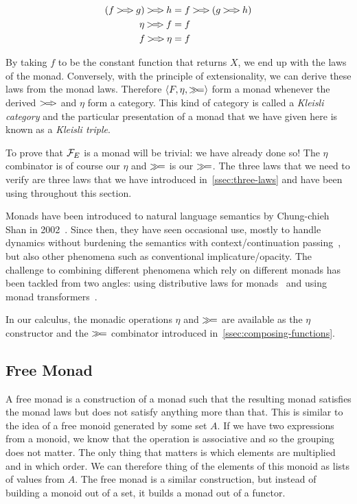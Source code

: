 \begin{align*}
  (f \kleisli g) \kleisli h &= f \kleisli (g \kleisli h) \\
  \eta \kleisli f &= f \\
  f \kleisli \eta &= f
\end{align*}

By taking $f$ to be the constant function that returns $X$, we end up with
the laws of the monad. Conversely, with the principle of extensionality, we
can derive these laws from the monad laws. Therefore
$\left<F, \eta, \mathbin{\gg\!=}\right>$ form a monad whenever the derived
$\mathbin{>\!=\!\!>}$ and $\eta$ form a category. This kind of category is called a
\emph{Kleisli category} and the particular presentation of a monad that we
have given here is known as a \emph{Kleisli triple}.

To prove that $\mathcal{F}_E$ is a monad will be trivial: we have already done so!
The $\eta$ combinator is of course our $\eta$ and $\mathbin{\gg\!=}$ is our
$\mathbin{\gg\!=}$. The three laws that we need to verify are three laws that we
have introduced in~\ref{ssec:three-laws} and have been using throughout
this section.

Monads have been introduced to natural language semantics by Chung-chieh
Shan in 2002~\cite{shan2002monads}. Since then, they have seen occasional
use, mostly to handle dynamics without burdening the semantics with
context/continuation passing~\cite{unger2011dynamic,champollion2015back},
but also other phenomena such as conventional
implicature/opacity\cite{giorgolo2011multidimensional,giorgolo2014monads,giorgolo2012missing}. The
challenge to combining different phenomena which rely on different monads
has been tackled from two angles: using distributive laws for
monads~\cite{giorgolo2015natural} and using monad
transformers~\cite{charlow2014semantics,barker2015monads}.

In our calculus, the monadic operations $\eta$ and $\mathbin{\gg\!=}$ are available
as the $\eta$ constructor and the $\mathbin{\gg\!=}$ combinator introduced
in~\ref{ssec:composing-functions}.

\subsection{Free Monad}
\label{ssec:free-monad}

A free monad is a construction of a monad such that the resulting monad
satisfies the monad laws but does not satisfy anything more than that. This
is similar to the idea of a free monoid generated by some set $A$. If we
have two expressions from a monoid, we know that the operation is
associative and so the grouping does not matter. The only thing that
matters is which elements are multiplied and in which order. We can
therefore thing of the elements of this monoid as lists of values from
$A$. The free monad is a similar construction, but instead of building a
monoid out of a set, it builds a monad out of a functor.

